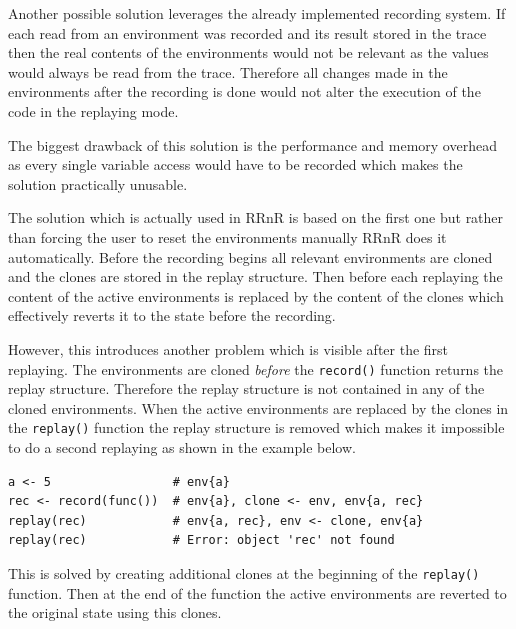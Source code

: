 \documentclass[thesis=M,english,hidelinks]{FITthesis}[2012/10/20]
\begin{document}
		Another possible solution leverages the already implemented recording system. If each read from an environment was recorded and its result stored in the trace then the real contents of the environments would not be relevant as the values would always be read from the trace. Therefore all changes made in the environments after the recording is done would not alter the execution of the code in the replaying mode.\par
		
		The biggest drawback of this solution is the performance and memory overhead as every single variable access would have to be recorded which makes the solution practically unusable.\par
		
		The solution which is actually used in RRnR is based on the first one but rather than forcing the user to reset the environments manually RRnR does it automatically. Before the recording begins all relevant environments are cloned and the clones are stored in the replay structure. Then before each replaying the content of the active environments is replaced by the content of the clones which effectively reverts it to the state before the recording.\par
		
		However, this introduces another problem which is visible after the first replaying. The environments are cloned \emph{before} the \lstinline|record()| function returns the replay structure. Therefore the replay structure is not contained in any of the cloned environments. When the active environments are replaced by the clones in the \lstinline|replay()| function the replay structure is removed which makes it impossible to do a second replaying as shown in the example below.\par
		
\begin{lstlisting}[style=filestyle, caption={Demonstration of environment replacement problem}]
a <- 5                 # env{a}
rec <- record(func())  # env{a}, clone <- env, env{a, rec}
replay(rec)            # env{a, rec}, env <- clone, env{a}
replay(rec)            # Error: object 'rec' not found
\end{lstlisting}
		
		This is solved by creating additional clones at the beginning of the \lstinline|replay()| function. Then at the end of the function the active environments are reverted to the original state using this clones.\par
		
\end{document}
